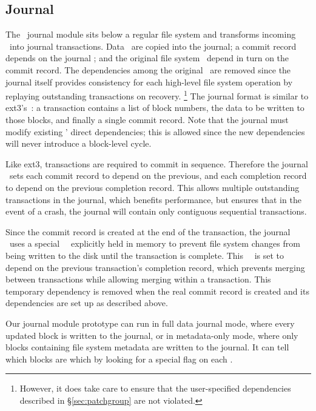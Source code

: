 
\subsection{Journal}
\label{sec:modules:journal}

The \Kudos\ journal module sits below a regular file system and transforms
incoming \patches\ into journal transactions.
%
Data \patches\ are copied into the journal; a commit record depends on the
journal \patches; and the original file system \patches\ depend in turn on the
commit record.
%
The dependencies among the original \patches\ are removed since the journal
itself provides consistency for each high-level file system operation by
replaying outstanding transactions on recovery.
\footnote{However, it does take care to ensure that the user-specified
dependencies described in \S\ref{sec:patchgroup} are not violated.}
%
The journal format is similar to ext3's~\cite{tweedie98journaling}: a
transaction contains a list of block numbers, the data to be written to
those blocks, and finally a single commit record.
%
Note that the journal must modify existing \patches' direct dependencies;
this is allowed since the new dependencies will never introduce a
block-level cycle.

Like ext3, transactions are required to commit in sequence. Therefore the
journal \module\ sets each commit record to depend on the previous, and each
completion record to depend on the previous completion record. This allows
multiple outstanding transactions in the journal, which benefits performance,
but ensures that in the event of a crash, the journal will contain only
contiguous sequential transactions.

Since the commit record is created at the end of the transaction, the journal
\module\ uses a special \noop\ \patch\ explicitly held in memory to prevent
file system changes from being written to the disk until the transaction is
complete. This \noop\ \patch\ is set to depend on the previous transaction's
completion record, which prevents merging between transactions while allowing
merging within a transaction. This temporary dependency is removed when the
real commit record is created and its dependencies are set up as described
above.



Our journal module prototype can run in full data journal mode, where every
updated block is written to the journal, or in metadata-only mode, where only
blocks containing file system metadata are written to the journal. It can
tell which blocks are which by looking for a special flag on each \patch.
